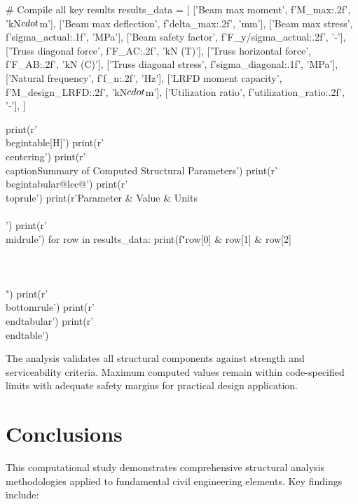 \documentclass[11pt,a4paper]{article}
\begin{document}
\begin{pycode}
# Compile all key results
results_data = [
    ['Beam max moment', f'{M_max:.2f}', 'kN$\\cdot$m'],
    ['Beam max deflection', f'{delta_max:.2f}', 'mm'],
    ['Beam max stress', f'{sigma_actual:.1f}', 'MPa'],
    ['Beam safety factor', f'{F_y/sigma_actual:.2f}', '-'],
    ['Truss diagonal force', f'{F_AC:.2f}', 'kN (T)'],
    ['Truss horizontal force', f'{F_AB:.2f}', 'kN (C)'],
    ['Truss diagonal stress', f'{sigma_diagonal:.1f}', 'MPa'],
    ['Natural frequency', f'{f_n:.2f}', 'Hz'],
    ['LRFD moment capacity', f'{M_design_LRFD:.2f}', 'kN$\\cdot$m'],
    ['Utilization ratio', f'{utilization_ratio:.2f}', '-'],
]

print(r'\\begin{table}[H]')
print(r'\\centering')
print(r'\\caption{Summary of Computed Structural Parameters}')
print(r'\\begin{tabular}{@{}lcc@{}}')
print(r'\\toprule')
print(r'Parameter & Value & Units \\\\')
print(r'\\midrule')
for row in results_data:
    print(f"{row[0]} & {row[1]} & {row[2]} \\\\\\\\")
print(r'\\bottomrule')
print(r'\\end{tabular}')
print(r'\\end{table}')
\end{pycode}

The analysis validates all structural components against strength and serviceability criteria. Maximum computed values remain within code-specified limits with adequate safety margins for practical design application.

\section{Conclusions}

This computational study demonstrates comprehensive structural analysis methodologies applied to fundamental civil engineering elements. Key findings include:
\end{document}
